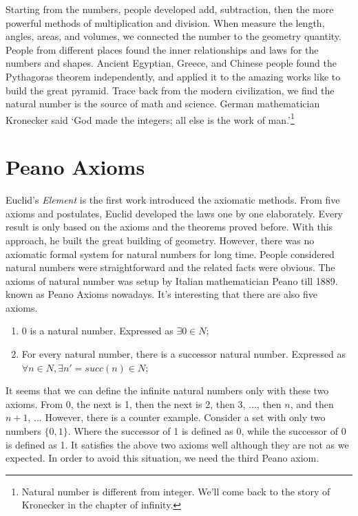 \documentclass[UTF8]{article}
\begin{document}
Starting from the numbers, people developed add, subtraction, then the more powerful methods of multiplication and division. When measure the length, angles, areas, and volumes, we connected the number to the geometry quantity. People from different places found the inner relationships and laws for the numbers and shapes. Ancient Egyptian, Greece, and Chinese people found the Pythagoras theorem independently, and applied it to the amazing works like to build the great pyramid. Trace back from the modern civilization, we find the natural number is the source of math and science. German mathematician Kronecker said `God made the integers; all else is the work of man.'\footnote{Natural number is different from integer. We'll come back to the story of Kronecker in the chapter of infinity.}


\section{Peano Axioms}

Euclid's {\em Element} is the first work introduced the axiomatic methods. From five axioms and postulates, Euclid developed the laws one by one elaborately. Every result is only based on the axioms and the theorems proved before. With this approach, he built the great building of geometry. However, there was no axiomatic formal system for natural numbers for long time. People considered natural numbers were straightforward and the related facts were obvious. The axioms of natural number was setup by Italian mathematician Peano till 1889. known as Peano Axioms nowadays. It's interesting that there are also five axioms.

\begin{enumerate}
\item 0 is a natural number. Expressed as $\exists 0 \in N$;
\item For every natural number, there is a successor natural number. Expressed as $\forall n \in N, \exists n' = succ(n) \in N$;
\end{enumerate}

It seems that we can define the infinite natural numbers only with these two axioms. From 0, the next is 1, then the next is 2, then 3, ..., then $n$, and then $n+1$, ... However, there is a counter example. Consider a set with only two numbers $\{0, 1\}$. Where the successor of 1 is defined as 0, while the successor of 0 is defined as 1. It satisfies the above two axioms well although they are not as we expected. In order to avoid this situation, we need the third Peano axiom.
\end{document}
